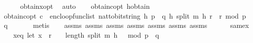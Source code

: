 \begin{isabellebody}
\ \ \ \ \isamarkupfalse%
\ obtain{\isacharunderscore}{\kern0pt}x{\isacharunderscore}{\kern0pt}opt{}\ \isamarkupfalse%
\ auto\isanewline
\isanewline
\ \ \isamarkupfalse%
\ obtain{\isacharunderscore}{\kern0pt}c{\isacharunderscore}{\kern0pt}opt{}\ h{\isacharunderscore}{\kern0pt}obtain\ \isanewline
\ \ \isamarkupfalse%
\ obtain{\isacharunderscore}{\kern0pt}c{\isacharunderscore}{\kern0pt}opt{}{\isacharcolon}{\kern0pt}\ {\isachardoublequoteopen}c\ {\isacharequal}{\kern0pt}\ enc{\isacharunderscore}{\kern0pt}loop{\isacharunderscore}{\kern0pt}func{\isacharunderscore}{\kern0pt}list\ {\isacharparenleft}{\kern0pt}nat{\isacharunderscore}{\kern0pt}to{\isacharunderscore}{\kern0pt}bitstring\ h{\isacharcomma}{\kern0pt}\ p\ {\isacharasterisk}{\kern0pt}\ q{\isacharcomma}{\kern0pt}\ h{\isacharcomma}{\kern0pt}\ {\isacharparenleft}{\kern0pt}split\ m\ h{\isacharparenright}{\kern0pt}{\isacharparenright}{\kern0pt}\ {\isacharparenleft}{\kern0pt}r\ {\isacharasterisk}{\kern0pt}\ r\ mod\ {\isacharparenleft}{\kern0pt}p\ {\isacharasterisk}{\kern0pt}\ q{\isacharparenright}{\kern0pt}{\isacharparenright}{\kern0pt}{\isachardoublequoteclose}\ \isanewline
\ \ \ \ \isamarkupfalse%
\ metis\isanewline
\isanewline
\ \ \isamarkupfalse%
\ assms{\isacharparenleft}{\kern0pt}{}{\isacharparenright}{\kern0pt}\ assms{\isacharparenleft}{\kern0pt}{}{\isacharparenright}{\kern0pt}\ assms{\isacharparenleft}{\kern0pt}{}{\isacharparenright}{\kern0pt}\ assms{\isacharparenleft}{\kern0pt}{}{\isacharparenright}{\kern0pt}\ assms{\isacharparenleft}{\kern0pt}{}{\isacharparenright}{\kern0pt}\ assms{\isacharparenleft}{\kern0pt}{}{\isacharparenright}{\kern0pt}\ assms{\isacharparenleft}{\kern0pt}{}{\isacharparenright}{\kern0pt}\isanewline
\ \ \ \ \ \ same{\isacharunderscore}{\kern0pt}x{\isacharunderscore}{\kern0pt}{}\isanewline
\ \ \isamarkupfalse%
\ x{\isacharunderscore}{\kern0pt}{}{\isacharunderscore}{\kern0pt}eq{\isacharcolon}{\kern0pt}\ {\isachardoublequoteopen}{\isacharparenleft}{\kern0pt}let\ x\ {\isacharequal}{\kern0pt}\ r\ {\isacharcircum}{\kern0pt}\ {}\ {\isacharcircum}{\kern0pt}\ {\isacharparenleft}{\kern0pt}length\ {\isacharparenleft}{\kern0pt}split\ m\ h{\isacharparenright}{\kern0pt}\ {\isacharplus}{\kern0pt}\ {}{\isacharparenright}{\kern0pt}\ mod\ {\isacharparenleft}{\kern0pt}p\ {\isacharasterisk}{\kern0pt}\ q{\isacharparenright}{\kern0pt}{\isacharsemicolon}{\kern0pt}\ \isanewline

\end{isabellebody}
